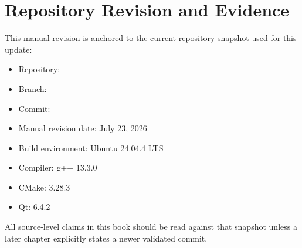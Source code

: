 \section*{Repository Revision and Evidence}
\label{sec:front-matter-repository-revision}

This manual revision is anchored to the current repository snapshot used for this update:

\begin{itemize}
\item Repository: 
\item Branch: 
\item Commit: 
\item Manual revision date: July 23, 2026
\item Build environment: Ubuntu 24.04.4 LTS
\item Compiler: g++ 13.3.0
\item CMake: 3.28.3
\item Qt: 6.4.2
\end{itemize}

All source-level claims in this book should be read against that snapshot unless a later chapter explicitly states a newer validated commit.
